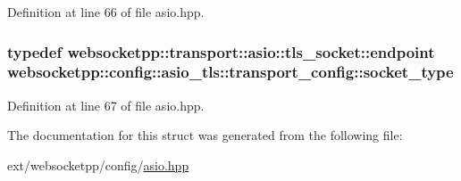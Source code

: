 Definition at line 66 of file asio.\+hpp.

\hypertarget{structwebsocketpp_1_1config_1_1asio__tls_1_1transport__config_a0c1767ea0f1c1f9cc58b3c4827549b1d}{}
\subsubsection[{socket\+\_\+type}]{\setlength{\rightskip}{0pt plus 5cm}typedef {\bf websocketpp\+::transport\+::asio\+::tls\+\_\+socket\+::endpoint} {\bf websocketpp\+::config\+::asio\+\_\+tls\+::transport\+\_\+config\+::socket\+\_\+type}}\label{structwebsocketpp_1_1config_1_1asio__tls_1_1transport__config_a0c1767ea0f1c1f9cc58b3c4827549b1d}


Definition at line 67 of file asio.\+hpp.



The documentation for this struct was generated from the following file\+:\begin{DoxyCompactItemize}
\item 
ext/websocketpp/config/\hyperlink{websocketpp_2config_2asio_8hpp}{asio.\+hpp}\end{DoxyCompactItemize}
